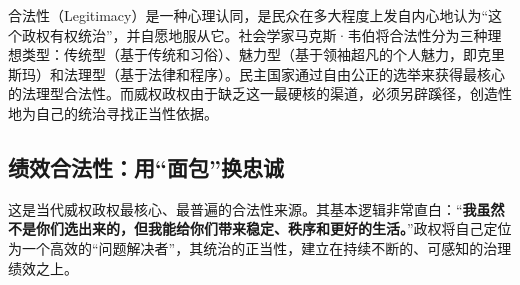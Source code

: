 合法性（Legitimacy）是一种心理认同，是民众在多大程度上发自内心地认为“这个政权有权统治”，并自愿地服从它。社会学家马克斯·韦伯将合法性分为三种理想类型：传统型（基于传统和习俗）、魅力型（基于领袖超凡的个人魅力，即克里斯玛）和法理型（基于法律和程序）。民主国家通过自由公正的选举来获得最核心的法理型合法性。而威权政权由于缺乏这一最硬核的渠道，必须另辟蹊径，创造性地为自己的统治寻找正当性依据。

\subsection{绩效合法性：用“面包”换忠诚}

这是当代威权政权最核心、最普遍的合法性来源。其基本逻辑非常直白：“\textbf{我虽然不是你们选出来的，但我能给你们带来稳定、秩序和更好的生活。}”政权将自己定位为一个高效的“问题解决者”，其统治的正当性，建立在持续不断的、可感知的治理绩效之上。

